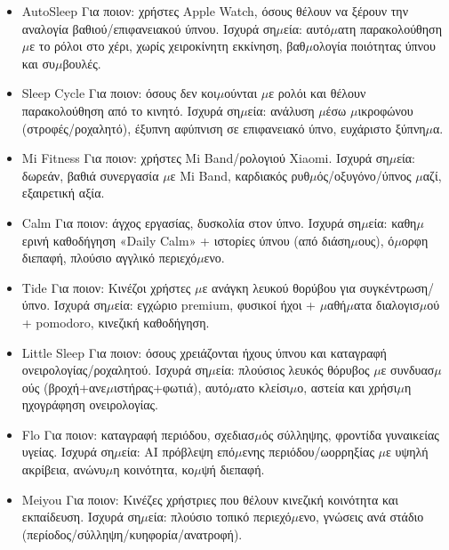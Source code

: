 
\begin{itemize}
  \item AutoSleep Για ποιον: χρήστες Apple Watch, όσους θέλουν να ξέρουν την αναλογία βαθιού/επιφανειακού ύπνου. Ισχυρά ση$\mu$εία: αυτό$\mu$ατη παρακολούθηση $\mu$ε το ρόλοι στο χέρι, χωρίς χειροκίνητη εκκίνηση, βαθ$\mu$ολογία ποιότητας ύπνου και συ$\mu$βουλές.
  \item Sleep Cycle Για ποιον: όσους δεν κοι$\mu$ούνται $\mu$ε ρολόι και θέλουν παρακολούθηση από το κινητό. Ισχυρά ση$\mu$εία: ανάλυση $\mu$έσω $\mu$ικροφώνου (στροφές/ροχαλητό), έξυπνη αφύπνιση σε επιφανειακό ύπνο, ευχάριστο ξύπνη$\mu$α.
  \item Mi Fitness Για ποιον: χρήστες Mi Band/ρολογιού Xiaomi. Ισχυρά ση$\mu$εία: δωρεάν, βαθιά συνεργασία $\mu$ε Mi Band, καρδιακός ρυθ$\mu$ός/οξυγόνο/ύπνος $\mu$αζί, εξαιρετική αξία.
\end{itemize}


\begin{itemize}
  \item Calm Για ποιον: άγχος εργασίας, δυσκολία στον ύπνο. Ισχυρά ση$\mu$εία: καθη$\mu$ερινή καθοδήγηση «Daily Calm» + ιστορίες ύπνου (από διάση$\mu$ους), ό$\mu$ορφη διεπαφή, πλούσιο αγγλικό περιεχό$\mu$ενο.
  \item Tide Για ποιον: Κινέζοι χρήστες $\mu$ε ανάγκη λευκού θορύβου για συγκέντρωση/ύπνο. Ισχυρά ση$\mu$εία: εγχώριο premium, φυσικοί ήχοι + $\mu$αθή$\mu$ατα διαλογισ$\mu$ού + pomodoro, κινεζική καθοδήγηση.
  \item Little Sleep Για ποιον: όσους χρειάζονται ήχους ύπνου και καταγραφή ονειρολογίας/ροχαλητού. Ισχυρά ση$\mu$εία: πλούσιος λευκός θόρυβος $\mu$ε συνδυασ$\mu$ούς (βροχή+ανε$\mu$ιστήρας+φωτιά), αυτό$\mu$ατο κλείσι$\mu$ο, αστεία και χρήσι$\mu$η ηχογράφηση ονειρολογίας.
\end{itemize}


\begin{itemize}
  \item Flo Για ποιον: καταγραφή περιόδου, σχεδιασ$\mu$ός σύλληψης, φροντίδα γυναικείας υγείας. Ισχυρά ση$\mu$εία: AI πρόβλεψη επό$\mu$ενης περιόδου/ωορρηξίας $\mu$ε υψηλή ακρίβεια, ανώνυ$\mu$η κοινότητα, κο$\mu$ψή διεπαφή.
  \item Meiyou Για ποιον: Κινέζες χρήστριες που θέλουν κινεζική κοινότητα και εκπαίδευση. Ισχυρά ση$\mu$εία: πλούσιο τοπικό περιεχό$\mu$ενο, γνώσεις ανά στάδιο (περίοδος/σύλληψη/κυηφορία/ανατροφή).
\end{itemize}

